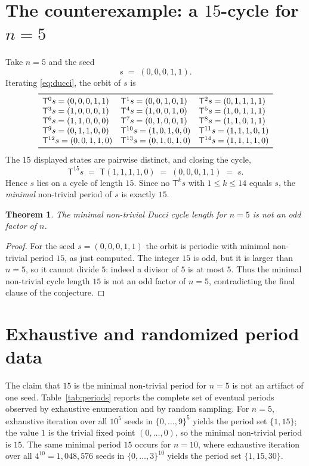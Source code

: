 \documentclass[11pt]{article}
\newtheorem{theorem}{Theorem}
\theoremstyle{definition}
\newcommand{\T}{\mathsf{T}}
\begin{document}
\section{The counterexample: a $15$-cycle for $n=5$}

Take $n = 5$ and the seed
\[
  s \;=\; (0,0,0,1,1).
\]
Iterating \eqref{eq:ducci}, the orbit of $s$ is
\[
\begin{array}{lll}
\toprule
\T^{0}s=(0,0,0,1,1) & \T^{1}s=(0,0,1,0,1) & \T^{2}s=(0,1,1,1,1)\\
\T^{3}s=(1,0,0,0,1) & \T^{4}s=(1,0,0,1,0) & \T^{5}s=(1,0,1,1,1)\\
\T^{6}s=(1,1,0,0,0) & \T^{7}s=(0,1,0,0,1) & \T^{8}s=(1,1,0,1,1)\\
\T^{9}s=(0,1,1,0,0) & \T^{10}s=(1,0,1,0,0) & \T^{11}s=(1,1,1,0,1)\\
\T^{12}s=(0,0,1,1,0) & \T^{13}s=(0,1,0,1,0) & \T^{14}s=(1,1,1,1,0)\\
\bottomrule
\end{array}
\]
The $15$ displayed states are pairwise distinct, and closing the cycle,
\[
  \T^{15}s \;=\; \T(1,1,1,1,0) \;=\; (0,0,0,1,1) \;=\; s .
\]
Hence $s$ lies on a cycle of length $15$. Since no $\T^k s$ with
$1 \le k \le 14$ equals $s$, the \emph{minimal} non-trivial period of $s$ is
exactly $15$.

\begin{theorem}\label{thm:main}
The minimal non-trivial Ducci cycle length for $n = 5$ is not an odd factor
of $n$.
\end{theorem}

\begin{proof}
For the seed $s = (0,0,0,1,1)$ the orbit is periodic with minimal non-trivial
period $15$, as just computed. The integer $15$ is odd, but it is larger than
$n = 5$, so it cannot divide $5$: indeed a divisor of $5$ is at most $5$.
Thus the minimal non-trivial cycle length $15$ is not an odd factor of $n = 5$,
contradicting the final clause of the conjecture.
\end{proof}

\section{Exhaustive and randomized period data}

The claim that $15$ is the minimal non-trivial period for $n=5$ is not an
artifact of one seed. Table~\ref{tab:periods} reports the complete set of
eventual periods observed by exhaustive enumeration and by random sampling.
For $n = 5$, exhaustive iteration over all $10^5$ seeds in $\{0,\dots,9\}^5$
yields the period set $\{1, 15\}$; the value $1$ is the trivial fixed point
$(0,\dots,0)$, so the minimal non-trivial period is $15$. The same minimal
period $15$ occurs for $n = 10$, where exhaustive iteration over all
$4^{10} = 1{,}048{,}576$ seeds in $\{0,\dots,3\}^{10}$ yields the period set
$\{1, 15, 30\}$.
\end{document}
